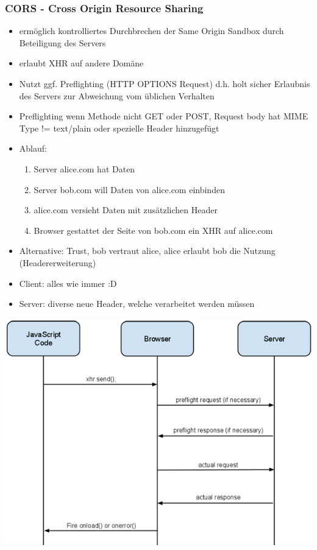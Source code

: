 \documentclass{article} %
\begin{document}
	\subsubsection{CORS - Cross Origin Resource Sharing}
	\begin{itemize}
		\item ermöglich kontrolliertes Durchbrechen der Same Origin Sandbox durch Beteiligung des Servers
		\item erlaubt XHR auf andere Domäne 
		\item Nutzt ggf. Preflighting (HTTP OPTIONS Request) d.h. holt sicher Erlaubnis des Servers zur Abweichung vom üblichen Verhalten
		\item Preflighting wenn Methode nicht GET oder POST, Request body hat MIME Type != text/plain oder spezielle Header hinzugefügt
		\item Ablauf:
		\begin{enumerate}
			\item Server alice.com hat Daten
			\item Server bob.com will Daten von alice.com einbinden
			\item alice.com versieht Daten mit zusätzlichen Header
			\item Browser gestattet der Seite von bob.com ein XHR auf alice.com
		\end{enumerate}
		\item Alternative: Trust, bob vertraut alice, alice erlaubt bob die Nutzung (Headererweiterung)
		\item Client: alles wie immer :D
		\item Server: diverse neue Header, welche verarbeitet werden müssen
	\end{itemize}
	\begin{center}
		\includegraphics[scale=0.3]{img/CORS_FLOW.png}
	\end{center}
\end{document}
